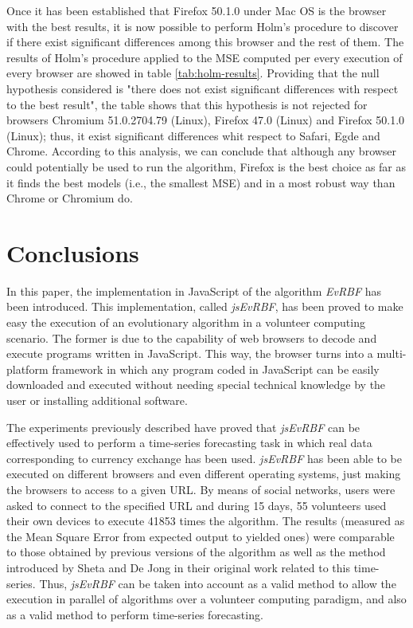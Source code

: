\documentclass{article}
\begin{document}
Once it has been established that Firefox 50.1.0 under Mac OS is the
browser with the best results, it is now possible  to perform Holm's
procedure to discover if there exist significant differences among
this browser and the rest of them. The results of Holm's procedure
applied to the MSE computed per every execution of every browser are
showed in table  \ref{tab:holm-results}. Providing that the null
hypothesis considered is "there does not exist significant differences with respect to the
best result", the table shows that this hypothesis is not rejected for
browsers  Chromium 51.0.2704.79 (Linux),  Firefox 47.0 (Linux) and Firefox 50.1.0 (Linux); thus, it exist significant differences whit respect to Safari, Egde and Chrome. According to this analysis, we can conclude that
although any browser could potentially be used to run the algorithm, Firefox is
the best choice as far as it finds the best models (i.e., the smallest
MSE) and in a most robust way than Chrome or Chromium do.


\section{Conclusions}
\label{sec:conclusions}

In this paper, the implementation in JavaScript of the algorithm {\em EvRBF} has been introduced. This implementation, called {\em jsEvRBF}, has been proved to make easy the execution of an evolutionary algorithm in a volunteer computing scenario. The former is due to the capability of web browsers to decode and execute programs written in JavaScript. This way, the browser turns into a multi-platform framework in which any program coded in JavaScript can be easily downloaded and executed without needing special technical knowledge by the user or installing additional software.

The experiments previously described have proved that {\em jsEvRBF} can be effectively used to perform a time-series forecasting task in which real data corresponding to currency exchange has been used. {\em jsEvRBF} has been able to be executed on different browsers and even different operating systems, just making the browsers to access to a given URL. By means of social networks, users were asked to connect to the specified URL and during 15 days, 55 volunteers used their own devices to execute 41853 times the algorithm. The results (measured as the Mean Square Error from expected output to yielded ones) were comparable to those obtained by previous versions of the algorithm as well as the method introduced by Sheta and De Jong\cite{Sheta2001} in their original work related to this time-series. Thus, {\em jsEvRBF} can be taken into account as a valid method to allow the execution in parallel of algorithms over a volunteer computing paradigm, and also as a valid method to perform time-series forecasting.
\end{document}
